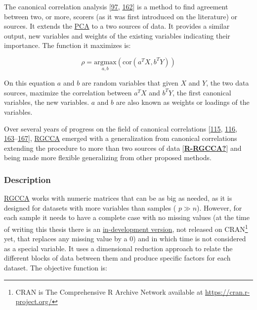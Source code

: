 \documentclass[
  12pt,
  a4paper,
  twoside,
  openright]{book}
\begin{document}
The canonical correlation analysis {[}\protect\hyperlink{ref-hotelling1936}{97}, \protect\hyperlink{ref-jordan1875}{162}{]} is a method to find agreement between two, or more, scorers (as it was first introduced on the literature) or sources.
It extends the \protect\hyperlink{acronyms_PCA}{PCA} to a two sources of data.
It provides a similar output, new variables and weights of the existing variables indicating their importance.
The function it maximizes is:

\[
\rho = \underset{a, b}{\text{argmax}} (\text{cor}(a^T X, b^T Y))
\]

On this equation \(a\) and \(b\) are random variables that given \(X\) and \(Y\), the two data sources, maximize the correlation between \(a^T X\) and \(b^T Y\), the first canonical variables, the new variables.
\(a\) and \(b\) are also known as weights or loadings of the variables.

Over several years of progress on the field of canonical correlations {[}\protect\hyperlink{ref-tenenhaus_regularized_2011}{115}, \protect\hyperlink{ref-tenenhaus_variable_2014}{116}, \protect\hyperlink{ref-tenenhaus_component-based_2008}{163}--\protect\hyperlink{ref-gloaguen2020}{167}{]}, \protect\hyperlink{acronyms_RGCCA}{RGCCA} emerged with a generalization from canonical correlations extending the procedure to more than two sources of data {[}\protect\hyperlink{ref-R-RGCCA}{\textbf{R-RGCCA?}}{]} and being made more flexible generalizing from other proposed methods.

\hypertarget{description}{%
\subsubsection{Description}\label{description}}

\protect\hyperlink{acronyms_RGCCA}{RGCCA} works with numeric matrices that can be as big as needed, as it is designed for datasets with more variables than samples ( \(p \gg n\)).
However, for each sample it needs to have a complete case with no missing values (at the time of writing this thesis there is an \href{https://github.com/rgcca-factory/RGCCA/tree/CRAN}{in-development version}, not released on CRAN\footnote{CRAN is The Comprehensive R Archive Network available at \url{https://cran.r-project.org/}} yet, that replaces any missing value by a 0) and in which time is not considered as a special variable.
It uses a dimensional reduction approach to relate the different blocks of data between them and produce specific factors for each dataset.
The objective function is:
\end{document}
